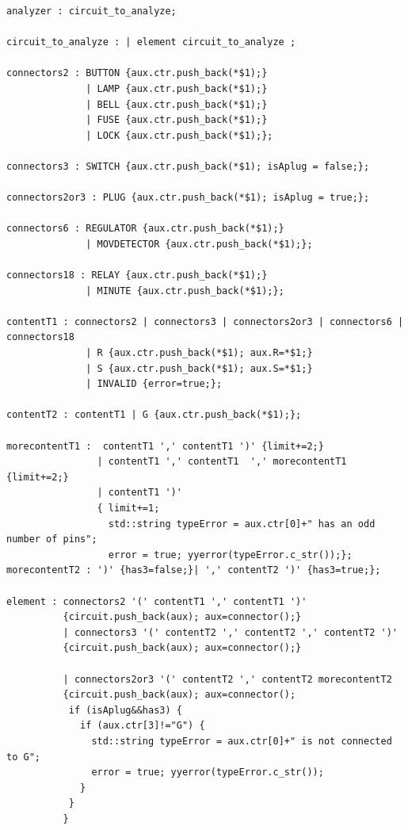 \documentclass{article}
\begin{document}
\newpage


\begin{lstlisting}[basicstyle=\footnotesize]
analyzer : circuit_to_analyze;

circuit_to_analyze : | element circuit_to_analyze ;

connectors2 : BUTTON {aux.ctr.push_back(*$1);}
              | LAMP {aux.ctr.push_back(*$1);}
              | BELL {aux.ctr.push_back(*$1);}
              | FUSE {aux.ctr.push_back(*$1);}
              | LOCK {aux.ctr.push_back(*$1);};

connectors3 : SWITCH {aux.ctr.push_back(*$1); isAplug = false;};

connectors2or3 : PLUG {aux.ctr.push_back(*$1); isAplug = true;};

connectors6 : REGULATOR {aux.ctr.push_back(*$1);}
              | MOVDETECTOR {aux.ctr.push_back(*$1);};

connectors18 : RELAY {aux.ctr.push_back(*$1);}
              | MINUTE {aux.ctr.push_back(*$1);};

contentT1 : connectors2 | connectors3 | connectors2or3 | connectors6 | connectors18
              | R {aux.ctr.push_back(*$1); aux.R=*$1;}
              | S {aux.ctr.push_back(*$1); aux.S=*$1;}
              | INVALID {error=true;};

contentT2 : contentT1 | G {aux.ctr.push_back(*$1);};

morecontentT1 :  contentT1 ',' contentT1 ')' {limit+=2;}
                | contentT1 ',' contentT1  ',' morecontentT1 {limit+=2;}
                | contentT1 ')'
                { limit+=1;
                  std::string typeError = aux.ctr[0]+" has an odd number of pins";
                  error = true; yyerror(typeError.c_str());};
morecontentT2 : ')' {has3=false;}| ',' contentT2 ')' {has3=true;};

element : connectors2 '(' contentT1 ',' contentT1 ')'
          {circuit.push_back(aux); aux=connector();}
          | connectors3 '(' contentT2 ',' contentT2 ',' contentT2 ')'
          {circuit.push_back(aux); aux=connector();}

          | connectors2or3 '(' contentT2 ',' contentT2 morecontentT2
          {circuit.push_back(aux); aux=connector();
           if (isAplug&&has3) {
             if (aux.ctr[3]!="G") {
               std::string typeError = aux.ctr[0]+" is not connected to G";
               error = true; yyerror(typeError.c_str());
             }
           }
          }


\end{lstlisting}
\end{document}
